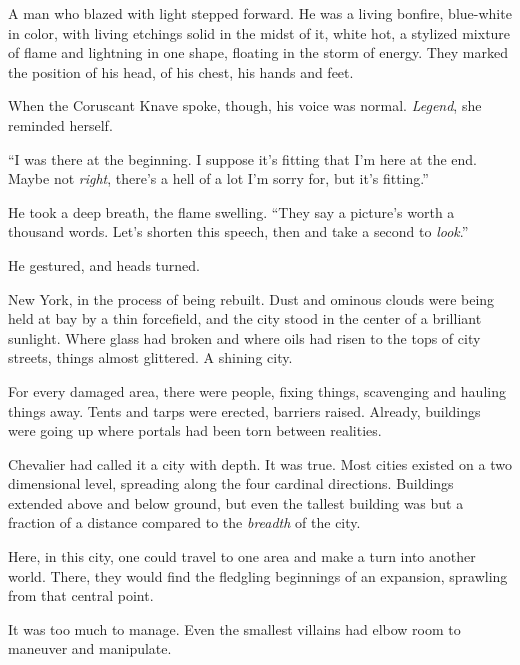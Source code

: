 A man who blazed with light stepped forward.  He was a living bonfire, blue-white in color, with living etchings solid in the midst of it, white hot, a stylized mixture of flame and lightning in one shape, floating in the storm of energy.  They marked the position of his head, of his chest, his hands and feet.



When the Coruscant Knave spoke, though, his voice was normal.  \emph{Legend}, she reminded herself.



``I was there at the beginning.  I suppose it's fitting that I'm here at the end.  Maybe not \emph{right}, there's a hell of a lot I'm sorry for, but it's fitting.''



He took a deep breath, the flame swelling.  ``They say a picture's worth a thousand words.  Let's shorten this speech, then and take a second to \emph{look}.''



He gestured, and heads turned.



New York, in the process of being rebuilt.  Dust and ominous clouds were being held at bay by a thin forcefield, and the city stood in the center of a brilliant sunlight.  Where glass had broken and where oils had risen to the tops of city streets, things almost glittered.  A shining city.



For every damaged area, there were people, fixing things, scavenging and hauling things away.  Tents and tarps were erected, barriers raised.  Already, buildings were going up where portals had been torn between realities.



Chevalier had called it a city with depth.  It was true.  Most cities existed on a two dimensional level, spreading along the four cardinal directions.  Buildings extended above and below ground, but even the tallest building was but a fraction of a distance compared to the \emph{breadth} of the city.



Here, in this city, one could travel to one area and make a turn into another world.  There, they would find the fledgling beginnings of an expansion, sprawling from that central point.



It was too much to manage.  Even the smallest villains had elbow room to maneuver and manipulate.




